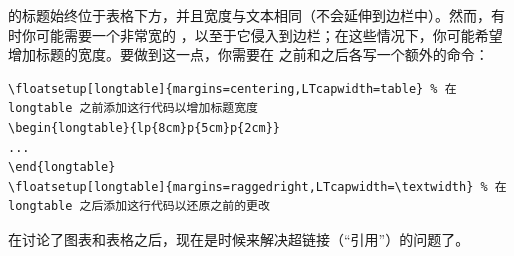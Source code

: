  的标题始终位于表格下方，并且宽度与文本相同（不会延伸到边栏中）。然而，有时你可能需要一个非常宽的 ，以至于它侵入到边栏；在这些情况下，你可能希望增加标题的宽度。要做到这一点，你需要在  之前和之后各写一个额外的命令：

\begin{lstlisting}[caption=增加 `\Environment{longtable}` 标题的宽度。]
\floatsetup[longtable]{margins=centering,LTcapwidth=table} % 在 longtable 之前添加这行代码以增加标题宽度
\begin{longtable}{lp{8cm}p{5cm}p{2cm}}
...
\end{longtable}
\floatsetup[longtable]{margins=raggedright,LTcapwidth=\textwidth} % 在 longtable 之后添加这行代码以还原之前的更改
\end{lstlisting}

在讨论了图表和表格之后，现在是时候来解决超链接（“引用”）的问题了。
